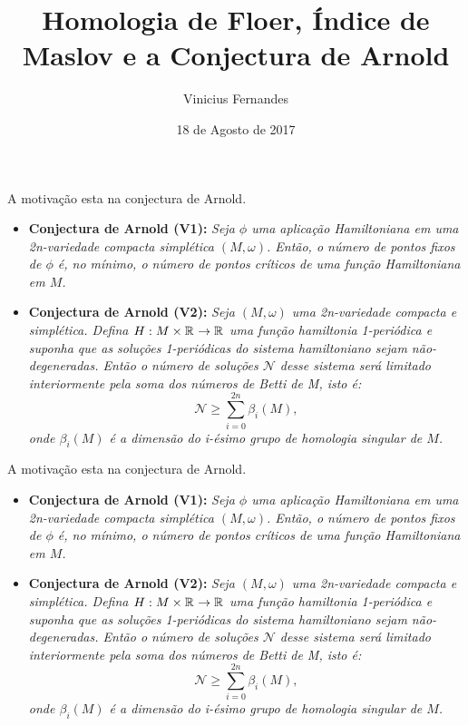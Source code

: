 \documentclass{beamer}
\author{Vinicius Fernandes}
\title{Homologia de Floer, Índice de Maslov e a Conjectura de Arnold}
\institute{Universidade Federal do ABC}
\date{18 de Agosto de 2017}
\begin{document}
	
\begin{frame}[t,plain]
\titlepage
\end{frame}

\begin{frame}

A motivação esta na conjectura de Arnold.

\begin{itemize}
	\item \textbf{Conjectura de Arnold (V1):} \textit{Seja $\phi$ uma aplicação Hamiltoniana em uma 2n-variedade compacta simplética $(M, \omega)$. Então, o número de pontos fixos de $\phi$ é, no mínimo, o número de pontos críticos de uma função Hamiltoniana em $M$.}
	\item \textbf{Conjectura de Arnold (V2):} \textit	{Seja $(M,\omega)$ uma 2n-variedade compacta e simplética. Defina  $H:M\times \mathbb{R}^{} \to \mathbb{R}^{}$  uma função hamiltonia 1-periódica e suponha que as soluções 1-periódicas do sistema hamiltoniano sejam não-degeneradas. Então o número de soluções $\mathcal{N}$ desse sistema será limitado interiormente pela soma dos números de Betti de M, isto é:
	$$
	\mathcal{N}\geq \sum_{i=0}^{2n}\beta_{i}(M),
	$$
	onde $\beta_{i}(M)$ é a dimensão do i-ésimo grupo de homologia singular de $M$.}
\end{itemize}
\end{frame}

\begin{frame}
	
	A motivação esta na conjectura de Arnold.
	
	\begin{itemize}
		\item \textbf{Conjectura de Arnold (V1):} \textit{Seja $\phi$ uma aplicação Hamiltoniana em uma 2n-variedade compacta simplética $(M, \omega)$. Então, o número de pontos fixos de $\phi$ é, no mínimo, o número de pontos críticos de uma função Hamiltoniana em $M$.}
		\item \textbf{Conjectura de Arnold (V2):} \textit	{Seja $(M,\omega)$ uma 2n-variedade compacta e simplética. Defina  $H:M\times \mathbb{R}^{} \to \mathbb{R}^{}$  uma função hamiltonia 1-periódica e suponha que as soluções 1-periódicas do sistema hamiltoniano sejam não-degeneradas. Então o número de soluções $\mathcal{N}$ desse sistema será limitado interiormente pela soma dos números de Betti de M, isto é:
			$$
			\mathcal{N}\geq \sum_{i=0}^{2n}\beta_{i}(M),
			$$
			onde $\beta_{i}(M)$ é a dimensão do i-ésimo grupo de homologia singular de $M$.}
	\end{itemize}
\end{frame}
\end{document}
